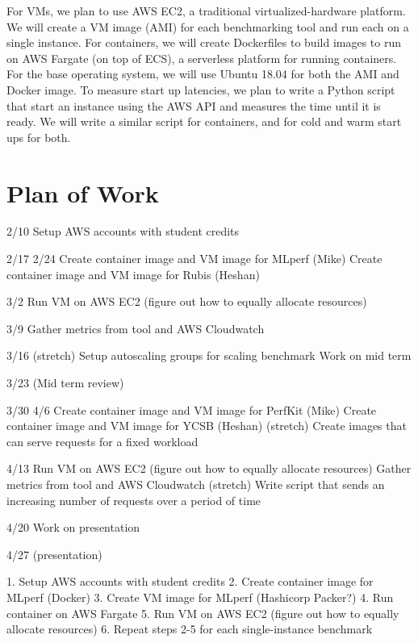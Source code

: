 \documentclass[11pt]{article}
\begin{document}
For VMs, we plan to use AWS EC2, a traditional virtualized-hardware platform. We will create a VM image (AMI) for each benchmarking tool and run each on a single instance.  For containers, we will create Dockerfiles to build images to run on AWS Fargate (on top of ECS), a serverless platform for running containers. For the base operating system, we will use Ubuntu 18.04 for both the AMI and Docker image. To measure start up latencies, we plan to write a Python script that start an instance using the AWS API and measures the time until it is ready. We will write a similar script for containers, and for cold and warm start ups for both.

\section{Plan of Work}


2/10
Setup AWS accounts with student credits

2/17
2/24
Create container image and VM image for MLperf (Mike)
Create container image and VM image for Rubis (Heshan)

3/2
Run VM on AWS EC2 (figure out how to equally allocate resources)

3/9
Gather metrics from tool and AWS Cloudwatch

3/16
(stretch) Setup autoscaling groups for scaling benchmark
Work on mid term

3/23 (Mid term review)

3/30
4/6
Create container image and VM image for PerfKit (Mike)
Create container image and VM image for YCSB (Heshan)
(stretch) Create images that can serve requests for a fixed workload

4/13
Run VM on AWS EC2 (figure out how to equally allocate resources)
Gather metrics from tool and AWS Cloudwatch
(stretch) Write script that sends an increasing number of requests over a period of time

4/20
Work on presentation

4/27 (presentation)

1. Setup AWS accounts with student credits
2. Create container image for MLperf (Docker)
3. Create VM image for MLperf (Hashicorp Packer?)
4. Run container on AWS Fargate
5. Run VM on AWS EC2 (figure out how to equally allocate resources)
6. Repeat steps 2-5 for each single-instance benchmark
\end{document}
